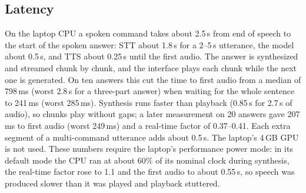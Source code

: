 \subsection{Latency}
\label{sec:latency}

On the laptop CPU a spoken command takes about 2.5\,s from end of speech to the start of the spoken answer: STT about 1.8\,s
for a 2--5\,s utterance, the model about 0.5\,s, and TTS about 0.25\,s until the first audio. The answer is synthesized and
streamed chunk by chunk, and the interface plays each chunk while the next one is generated. On ten answers this cut the time
to first audio from a median of 798\,ms (worst 2.8\,s for a three-part answer) when waiting for the whole sentence to 241\,ms
(worst 285\,ms). Synthesis runs faster than playback (0.85\,s for 2.7\,s of audio), so chunks play without gaps; a later
measurement on 20 answers gave 207\,ms to first audio (worst 249\,ms) and a real-time factor of 0.37--0.41. Each extra
segment of a multi-command utterance adds about 0.5\,s. The laptop's 4\,GB GPU is not used. These numbers require the
laptop's performance power mode: in its default mode the CPU ran at about 60\% of its nominal clock during synthesis, the
real-time factor rose to 1.1 and the first audio to about 0.55\,s, so speech was produced slower than it was played and
playback stuttered.
